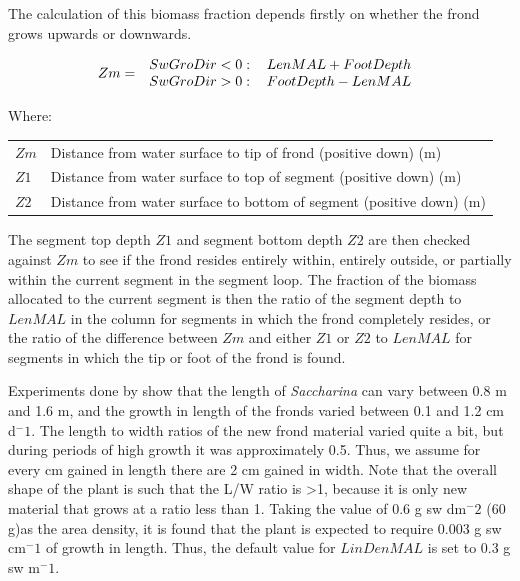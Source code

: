 \documentclass{deltares_manual}
\begin{document}
The calculation of this biomass fraction depends firstly on whether the frond grows upwards or downwards.

\begin{equation}
Zm =  
\left 
.\begin{tabular}{cc}
$SwGroDir < 0:$& $LenMAL + FootDepth$\\
$SwGroDir > 0:$& $FootDepth - LenMAL$\\
\end{tabular}
\right
.\end{equation}

Where:\\

\begin{tabular}{ll}
$Zm$ & Distance from water surface to tip of frond (positive down) (m)\\
$Z1$ & Distance from water surface to top of segment (positive down) (m)\\
$Z2$ & Distance from water surface to bottom of segment (positive down) (m)\\
\end{tabular}

The segment top depth $Z1$ and segment bottom depth $Z2$ are then checked against $Zm$ to see if the frond resides entirely within, entirely outside, or partially within the current segment in the segment loop. The fraction of the biomass allocated to the current segment is then the ratio of the segment depth to $LenMAL$ in the column for segments in which the frond completely resides, or the ratio of the difference between $Zm$ and either $Z1$ or $Z2$ to $LenMAL$ for segments in which the tip or foot of the frond is found.

Experiments done by \cite{sjotun1993} show that the length of \textit{Saccharina} can vary between 0.8 m and 1.6 m, and the growth in length of the fronds varied between 0.1 and 1.2 cm d${^-1}$. The length to width ratios of the new frond material varied quite a bit, but during periods of high growth it was approximately 0.5. Thus, we assume for every cm gained in length there are 2 cm gained in width. Note that the overall shape of the plant is such that the L/W ratio is \textgreater 1, because it is only new material that grows at a ratio less than 1. Taking the \cite{broch2012} value of 0.6 g sw dm${^-2}$ (60 g)as the area density, it is found that the plant is expected to require 0.003 g sw cm${^-1}$ of growth in length. Thus, the default value for $LinDenMAL$ is set to 0.3 g sw m${^-1}$.
\end{document}
